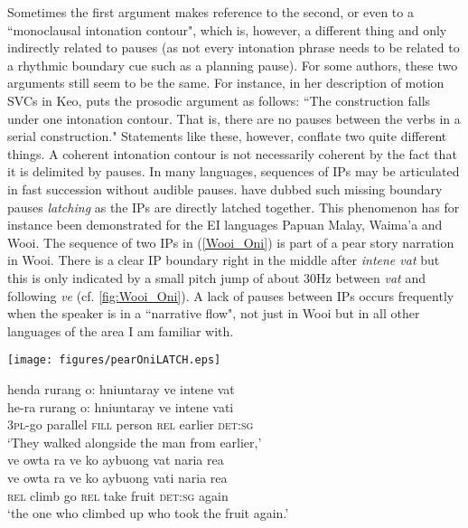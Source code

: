 \largerpage[-2]
Sometimes the first argument makes reference to the second, or even to a ``monoclausal intonation contour", which is, however, a different thing and only indirectly related to pauses (as not every intonation phrase needs to be related to a rhythmic boundary cue such as a planning pause). For some authors, these two arguments still seem to be the same. For instance, in her description of motion SVCs in Keo, \citet[56]{baird2008motion} puts the prosodic argument as follows: ``The construction falls under one intonation contour. That is, there are no pauses between the verbs in a serial construction." Statements like these, however, conflate two quite different things. A coherent intonation contour is not necessarily coherent by the fact that it is delimited by pauses. In many languages, sequences of IPs may be articulated in fast succession without audible pauses. \citet{himmelmann2018} have dubbed such missing boundary pauses \textit{latching} as the IPs are directly latched together. This phenomenon has for instance been demonstrated for the EI languages Papuan Malay, Waima'a and Wooi. The sequence of two IPs in (\ref{Wooi_Oni}) is part of a pear story narration in Wooi. There is a clear IP boundary right in the middle after \textit{intene vat} but this is only indicated by a small pitch jump of about 30Hz between \textit{vat} and following \textit{ve} (cf. \ref{fig:Wooi_Oni}). A lack of pauses between IPs occurs frequently when the speaker is in a ``narrative flow", not just in Wooi but in all other languages of the area I am familiar with.

\begin{sidewaysfigure}
\texttt{[image: figures/pearOniLATCH.eps]} 
\caption{F$_0$ contour of example (\ref{Wooi_Oni})}\label{fig:Wooi_Oni}
\end{sidewaysfigure}

\ea \label{Wooi_Oni} 
\ea
\glll henda rurang o: hniuntaray ve intene vat \\
he-ra rurang o: hniuntaray ve intene vati \\
3\textsc{pl}-go parallel \textsc{fill} person \textsc{rel} earlier \textsc{det}:\textsc{sg} \\
\glft `They walked alongside the man from earlier,' \\ 
\ex
\glll ve owta ra ve ko aybuong vat naria rea \\ 
ve owta ra ve ko aybuong vati naria rea \\
\textsc{rel} climb go \textsc{rel} take fruit \textsc{det}:\textsc{sg} again  \\
\glft `the one who climbed up who took the fruit again.'\\ 
\z
\z

